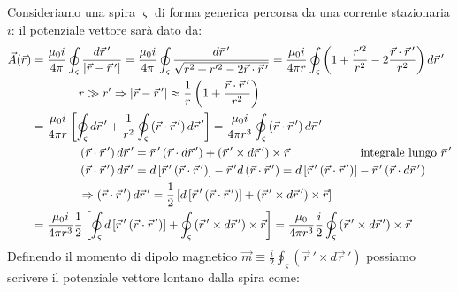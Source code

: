 \documentclass[]{article}
\begin{document}
Consideriamo una spira $ \varsigma $ di forma generica percorsa da una corrente stazionaria $ i $: il potenziale vettore sarà dato da:
\begin{equation}
	\begin{split}
		\vec{A}(\vec{r}) &= \displaystyle\frac{\mu_0 i}{4\pi} \oint_{\varsigma} \displaystyle\frac{d\vec{r}\,'}{\left\lvert\vec{r} - \vec{r}\,'\right\rvert} = \displaystyle\frac{\mu_0 i}{4\pi} \oint_{\varsigma} \displaystyle\frac{d\vec{r}\,'}{\sqrt{r^2 + r'^2 - 2\vec{r}\cdot\vec{r}\,'}} = \displaystyle\frac{\mu_0 i}{4\pi r} \oint_{\varsigma} \left( 1 + \displaystyle\frac{r'^2}{r^2} - 2 \displaystyle\frac{\vec{r}\cdot\vec{r}\,'}{r^2} \right) d\vec{r}\,' \\ 
				 & \qquad\qquad r \gg r' \Rightarrow \left\lvert\vec{r} - \vec{r}\,'\right\rvert \approx \frac{1}{r} \left(1 + \frac{\vec{r}\cdot\vec{r}\,'}{r^2}\right) \\ 
				 &= \displaystyle\frac{\mu_0 i}{4\pi r} \left[ \oint_{\varsigma} d\vec{r}\,' + \displaystyle\frac{1}{r^2} \oint_{\varsigma} \left( \vec{r}\cdot\vec{r}\,' \right) d\vec{r}\,' \right] = \displaystyle\frac{\mu_0 i}{4\pi r^3} \oint_{\varsigma} \left( \vec{r}\cdot\vec{r}\,' \right) d\vec{r}\,' \\ 
				 & \qquad\qquad \left(\vec{r}\cdot\vec{r}\,'\right) d\vec{r}\,' = \vec{r}\,' \left(\vec{r}\cdot d\vec{r}\,'\right) + \left(\vec{r}\,'\times d\vec{r}\,'\right)\times\vec{r} \qquad \qquad \qquad \text{integrale lungo } \vec{r}\,' \\ 
				 & \qquad\qquad \left(\vec{r}\cdot\vec{r}\,'\right) d\vec{r}\,' = d\left[\vec{r}\,'\left(\vec{r}\cdot\vec{r}\,'\right)\right] - \vec{r}\,'d\left(\vec{r}\cdot\vec{r}\,'\right) = d\left[\vec{r}\,'\left(\vec{r}\cdot\vec{r}\,'\right)\right] - \vec{r}\,'\left(\vec{r}\cdot d\vec{r}\,'\right) \\ 
				 & \qquad \qquad \Rightarrow \left(\vec{r}\cdot\vec{r}\,'\right)d\vec{r}\,' = \frac{1}{2} \left[ d\left[ \vec{r}\,' \left(\vec{r}\cdot\vec{r}\,'\right)\right] + \left(\vec{r}\,' \times d\vec{r}\,'\right) \times\vec{r} \right] \\ 
				 &= \displaystyle\frac{\mu_0 i}{4\pi r^3} \displaystyle\frac{1}{2} \left[ \oint_{\varsigma} d\left[ \vec{r}\,' \left(\vec{r}\cdot\vec{r}\,'\right)\right] + \oint_{\varsigma} \left(\vec{r}\,' \times d\vec{r}\,'\right) \times\vec{r} \right] = \displaystyle\frac{\mu_0}{4\pi r^3} \displaystyle\frac{i}{2} \oint_{\varsigma} \left(\vec{r}\,' \times d\vec{r}\,'\right) \times\vec{r} 
	\end{split}
	\label{eq:pot-vett-sp}
\end{equation}
Definendo il momento di dipolo magnetico $ \vec{m} \equiv \frac{i}{2} \oint_{\varsigma} \left(\vec{r}\,'\times d\vec{r}\,'\right) $ possiamo scrivere il potenziale vettore lontano dalla spira come:
\end{document}
